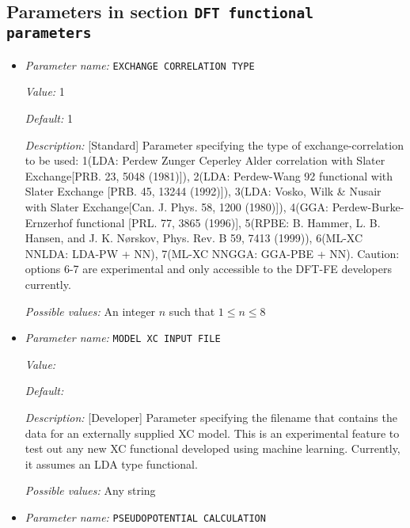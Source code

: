 \subsection{Parameters in section \tt DFT functional parameters}
\label{parameters:DFT_20functional_20parameters}

\begin{itemize}
\item {\it Parameter name:} {\tt EXCHANGE CORRELATION TYPE}
\label{parameters:DFT functional parameters/EXCHANGE CORRELATION TYPE}
\label{parameters:DFT_20functional_20parameters/EXCHANGE_20CORRELATION_20TYPE}


{\it Value:} 1


{\it Default:} 1


{\it Description:} [Standard] Parameter specifying the type of exchange-correlation to be used: 1(LDA: Perdew Zunger Ceperley Alder correlation with Slater Exchange[PRB. 23, 5048 (1981)]), 2(LDA: Perdew-Wang 92 functional with Slater Exchange [PRB. 45, 13244 (1992)]), 3(LDA: Vosko, Wilk \& Nusair with Slater Exchange[Can. J. Phys. 58, 1200 (1980)]), 4(GGA: Perdew-Burke-Ernzerhof functional [PRL. 77, 3865 (1996)], 5(RPBE: B. Hammer, L. B. Hansen, and J. K. Nørskov, Phys. Rev. B 59, 7413 (1999)), 6(ML-XC NNLDA: LDA-PW + NN), 7(ML-XC NNGGA: GGA-PBE + NN). Caution: options 6-7 are experimental and only accessible to the DFT-FE developers currently.


{\it Possible values:} An integer $n$ such that $1\leq n \leq 8$
\item {\it Parameter name:} {\tt MODEL XC INPUT FILE}
\label{parameters:DFT functional parameters/MODEL XC INPUT FILE}
\label{parameters:DFT_20functional_20parameters/MODEL_20XC_20INPUT_20FILE}


{\it Value:} 


{\it Default:} 


{\it Description:} [Developer] Parameter specifying the filename that contains the data for an externally supplied XC model. This is an experimental feature to test out any new XC functional developed using machine learning. Currently, it assumes an LDA type functional.


{\it Possible values:} Any string
\item {\it Parameter name:} {\tt PSEUDOPOTENTIAL CALCULATION}
\label{parameters:DFT functional parameters/PSEUDOPOTENTIAL CALCULATION}
\label{parameters:DFT_20functional_20parameters/PSEUDOPOTENTIAL_20CALCULATION}



\end{itemize}
